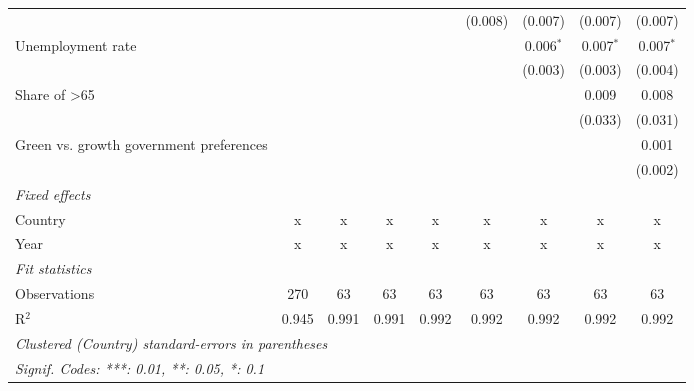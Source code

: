 \begin{table}[htbp]
\begin{tabular}{lcccccccc}
                                                              &         &         &         &             & (0.008)     & (0.007)     & (0.007)     & (0.007)\\   
      Unemployment rate                                       &         &         &         &             &             & 0.006$^{*}$ & 0.007$^{*}$ & 0.007$^{*}$\\   
                                                              &         &         &         &             &             & (0.003)     & (0.003)     & (0.004)\\   
      Share of >65                                            &         &         &         &             &             &             & 0.009       & 0.008\\   
                                                              &         &         &         &             &             &             & (0.033)     & (0.031)\\   
      Green vs. growth government preferences                 &         &         &         &             &             &             &             & 0.001\\   
                                                              &         &         &         &             &             &             &             & (0.002)\\   
      \emph{Fixed effects}\\
      Country                                                 & x       & x       & x       & x           & x           & x           & x           & x\\  
      Year                                                    & x       & x       & x       & x           & x           & x           & x           & x\\  
      \midrule \emph{Fit statistics}\\
      Observations                                            & 270     & 63      & 63      & 63          & 63          & 63          & 63          & 63\\  
      R$^2$                                                   & 0.945   & 0.991   & 0.991   & 0.992       & 0.992       & 0.992       & 0.992       & 0.992\\  
      \midrule
      \multicolumn{9}{l}{\emph{Clustered (Country) standard-errors in parentheses}}\\
      \multicolumn{9}{l}{\emph{Signif. Codes: ***: 0.01, **: 0.05, *: 0.1}}\\
   \end{tabular}
\end{table}


